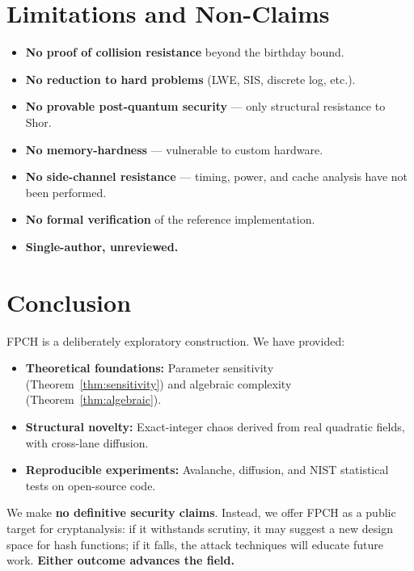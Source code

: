 \documentclass[11pt,a4paper]{article}
\theoremstyle{plain}
\theoremstyle{definition}
\theoremstyle{remark}
\begin{document}
\section{Limitations and Non-Claims}

\begin{itemize}
    \item \textbf{No proof of collision resistance} beyond the birthday bound.
    \item \textbf{No reduction to hard problems} (LWE, SIS, discrete log, etc.).
    \item \textbf{No provable post-quantum security} --- only structural resistance to Shor.
    \item \textbf{No memory-hardness} --- vulnerable to custom hardware.
    \item \textbf{No side-channel resistance} --- timing, power, and cache analysis have not been performed.
    \item \textbf{No formal verification} of the reference implementation.
    \item \textbf{Single-author, unreviewed.}
\end{itemize}

\section{Conclusion}

FPCH is a deliberately exploratory construction. We have provided:
\begin{itemize}
    \item \textbf{Theoretical foundations:} Parameter sensitivity (Theorem~\ref{thm:sensitivity}) and algebraic complexity (Theorem~\ref{thm:algebraic}).
    \item \textbf{Structural novelty:} Exact-integer chaos derived from real quadratic fields, with cross-lane diffusion.
    \item \textbf{Reproducible experiments:} Avalanche, diffusion, and NIST statistical tests on open-source code.
\end{itemize}

We make \textbf{no definitive security claims}. Instead, we offer FPCH as a public target for cryptanalysis: if it withstands scrutiny, it may suggest a new design space for hash functions; if it falls, the attack techniques will educate future work. \textbf{Either outcome advances the field.}
\end{document}
